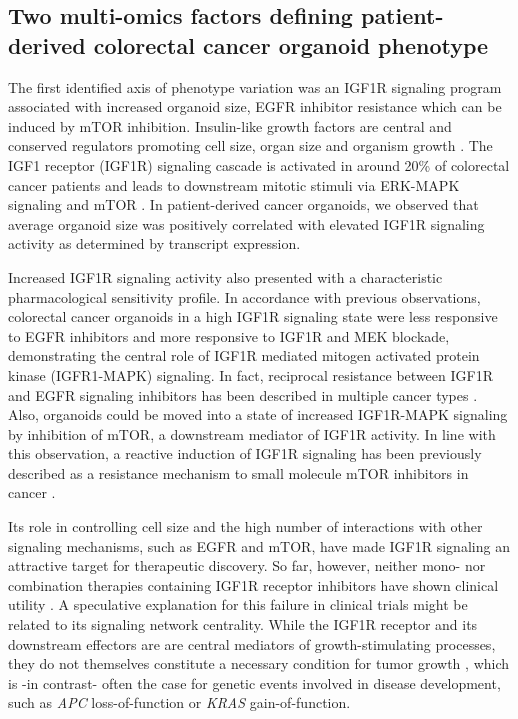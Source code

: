 \begin{flushleft}
\subsection{Two multi-omics factors defining patient-derived colorectal cancer organoid phenotype}

The first identified axis of phenotype variation was an IGF1R signaling program associated with increased organoid size, EGFR inhibitor resistance which can be induced by mTOR inhibition. Insulin-like growth factors are central and conserved regulators promoting cell size, organ size and organism growth \parencite{pucheHumanConditionsInsulinlike2012, sunMechanismCellSize2006}. The IGF1 receptor (IGF1R) signaling cascade is activated in around 20\% of colorectal cancer patients and leads to downstream mitotic stimuli via ERK-MAPK signaling and mTOR \parencite{zhongOverproductionIGF2Drives2017}. In patient-derived cancer organoids, we observed that average organoid size was positively correlated with elevated IGF1R signaling activity as determined by transcript expression.
\smallbreak

Increased IGF1R signaling activity also presented with a characteristic pharmacological sensitivity profile. In accordance with previous observations\parencite{isellaSelectiveAnalysisCancercell2017}, colorectal cancer organoids in a high IGF1R signaling state were less responsive to EGFR inhibitors and more responsive to IGF1R and MEK blockade, demonstrating the central role of IGF1R mediated mitogen activated protein kinase (IGFR1-MAPK) signaling. In fact, reciprocal resistance between IGF1R and EGFR signaling inhibitors has been described in multiple cancer types \parencite{huaInsulinlikeGrowthFactor2020a}. Also, organoids could be moved into a state of increased IGF1R-MAPK signaling by inhibition of mTOR, a downstream mediator of IGF1R activity. In line with this observation, a reactive induction of IGF1R signaling has been previously described as a resistance mechanism to small molecule mTOR inhibitors in cancer \parencite{sharmaChromatinmediatedReversibleDrugtolerant2010, yoonFocalAdhesionIGF1RDependent2017a}. 
\smallbreak

Its role in controlling cell size and the high number of interactions with other signaling mechanisms, such as EGFR and mTOR, have made IGF1R signaling an attractive target for therapeutic discovery. So far, however, neither mono- nor combination therapies containing IGF1R receptor inhibitors have shown clinical utility \parencite{beckwithMinireviewWereIGF2015, jentzschCostsCausesOncology2023}. A speculative explanation for this failure in clinical trials might be related to its signaling network centrality. While the IGF1R receptor and its downstream effectors are are central mediators of growth-stimulating processes, they do not themselves constitute a necessary condition for tumor growth \parencite{beckwithMinireviewWereIGF2015}, which is -in contrast- often the case for genetic events involved in disease development, such as \textit{APC} loss-of-function \parencite{dowApcRestorationPromotes2015a} or \textit{KRAS} gain-of-function. 
\smallbreak


\end{flushleft}
